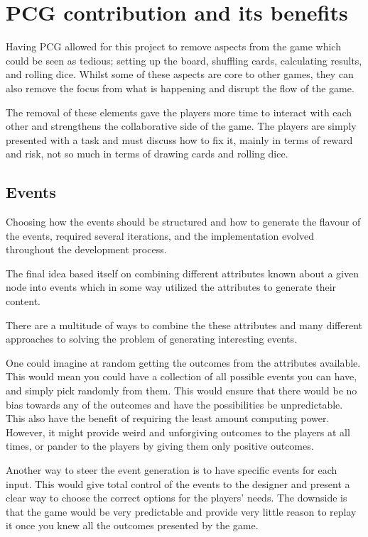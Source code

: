 \section{PCG contribution and its benefits}
\label{sec:pcgben}
Having PCG allowed for this project to remove aspects from the game which could be seen as tedious; setting up the board, shuffling cards, calculating results, and rolling dice. Whilst some of these aspects are core to other games, they can also remove the focus from what is happening and disrupt the flow of the game.

The removal of these elements gave the players more time to interact with each other and strengthens the collaborative side of the game. The players are simply presented with a task and must discuss how to fix it, mainly in terms of reward and risk, not so much in terms of drawing cards and rolling dice.


\subsection{Events}
Choosing how the events should be structured and how to generate the flavour of the events, required several iterations, and the implementation evolved throughout the development process.

The final idea based itself on combining different attributes known about a given node into events which in some way utilized the attributes to generate their content. 

There are a multitude of ways to combine the these attributes and many different approaches to solving the problem of generating interesting events.

One could imagine at random getting the outcomes from the attributes available. 
This would mean you could have a collection of all possible events you can have, and simply pick randomly from them. 
This would ensure that there would be no bias towards any of the outcomes and have the possibilities be unpredictable. This also have the benefit of requiring the least amount computing power. 
However, it might provide weird and unforgiving outcomes to the players at all times, or pander to the players by giving them only positive outcomes.

Another way to steer the event generation is to have specific events for each input. This would give total control of the events to the designer and present a clear way to choose the correct options for the players' needs.
The downside is that the game would be very predictable and provide very little reason to replay it once you knew all the outcomes presented by the game.

